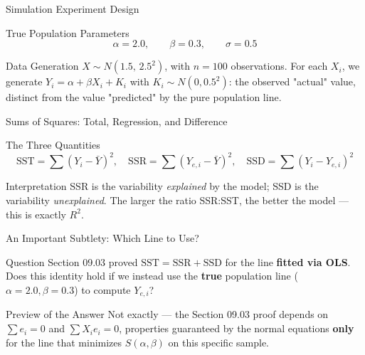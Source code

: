 \documentclass[10pt, aspectratio=169]{beamer}
\begin{document}
\begin{frame}{Simulation Experiment Design}
  \footnotesize
  \begin{block}{True Population Parameters}
    $$\alpha=2.0, \qquad \beta=0.3, \qquad \sigma=0.5$$
  \end{block}
  \pause

  \vspace{0.1cm}
  \begin{alertblock}{Data Generation}
    $X\sim N(1.5,\,2.5^2)$, with $n=100$ observations. For each $X_i$, we generate $Y_i=\alpha+\beta X_i+K_i$ with $K_i\sim N(0,0.5^2)$: the observed "actual" value, distinct from the value "predicted" by the pure population line.
  \end{alertblock}
\end{frame}

\begin{frame}{Sums of Squares: Total, Regression, and Difference}
  \footnotesize
  \begin{block}{The Three Quantities}
    $$\text{SST}=\sum(Y_i-\bar Y)^2, \quad \text{SSR}=\sum(Y_{e,i}-\bar Y)^2, \quad \text{SSD}=\sum(Y_i-Y_{e,i})^2$$
  \end{block}
  \pause

  \vspace{0.1cm}
  \begin{alertblock}{Interpretation}
    SSR is the variability \emph{explained} by the model; SSD is the variability \emph{unexplained}. The larger the ratio SSR:SST, the better the model --- this is exactly $R^2$.
  \end{alertblock}
\end{frame}

\begin{frame}{An Important Subtlety: Which Line to Use?}
  \footnotesize
  \begin{alertblock}{Question}
    Section 09.03 proved $\text{SST}=\text{SSR}+\text{SSD}$ for the line \textbf{fitted via OLS}. Does this identity hold if we instead use the \textbf{true} population line ($\alpha=2.0,\beta=0.3$) to compute $Y_{e,i}$?
  \end{alertblock}
  \pause

  \vspace{0.1cm}
  \begin{block}{Preview of the Answer}
    Not exactly --- the Section 09.03 proof depends on $\sum e_i=0$ and $\sum X_ie_i=0$, properties guaranteed by the normal equations \textbf{only} for the line that minimizes $S(\alpha,\beta)$ on this specific sample.
  \end{block}
\end{frame}
\end{document}
